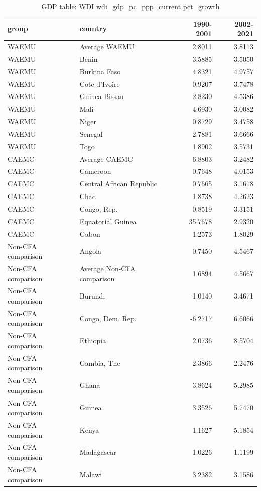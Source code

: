 \begin{table}

\caption{GDP table: WDI wdi_gdp_pc_ppp_current pct_growth}
\centering
\begin{tabular}[t]{llrr}
\toprule
group & country & 1990-2001 & 2002-2021\\
\midrule
WAEMU & Average WAEMU & 2.8011 & 3.8113\\
WAEMU & Benin & 3.5885 & 3.5050\\
WAEMU & Burkina Faso & 4.8321 & 4.9757\\
WAEMU & Cote d'Ivoire & 0.9207 & 3.7478\\
WAEMU & Guinea-Bissau & 2.8230 & 4.5386\\
\addlinespace
WAEMU & Mali & 4.6930 & 3.0082\\
WAEMU & Niger & 0.8729 & 3.4758\\
WAEMU & Senegal & 2.7881 & 3.6666\\
WAEMU & Togo & 1.8902 & 3.5731\\
CAEMC & Average CAEMC & 6.8803 & 3.2482\\
\addlinespace
CAEMC & Cameroon & 0.7648 & 4.0153\\
CAEMC & Central African Republic & 0.7665 & 3.1618\\
CAEMC & Chad & 1.8738 & 4.2623\\
CAEMC & Congo, Rep. & 0.8519 & 3.3151\\
CAEMC & Equatorial Guinea & 35.7678 & 2.9320\\
\addlinespace
CAEMC & Gabon & 1.2573 & 1.8029\\
Non-CFA comparison & Angola & 0.7450 & 4.5467\\
Non-CFA comparison & Average Non-CFA comparison & 1.6894 & 4.5667\\
Non-CFA comparison & Burundi & -1.0140 & 3.4671\\
Non-CFA comparison & Congo, Dem. Rep. & -6.2717 & 6.6066\\
\addlinespace
Non-CFA comparison & Ethiopia & 2.0736 & 8.5704\\
Non-CFA comparison & Gambia, The & 2.3866 & 2.2476\\
Non-CFA comparison & Ghana & 3.8624 & 5.2985\\
Non-CFA comparison & Guinea & 3.3526 & 5.7470\\
Non-CFA comparison & Kenya & 1.1627 & 5.1854\\
\addlinespace
Non-CFA comparison & Madagascar & 1.0226 & 1.1199\\
Non-CFA comparison & Malawi & 3.2382 & 3.1586\\

\end{tabular}
\end{table}

